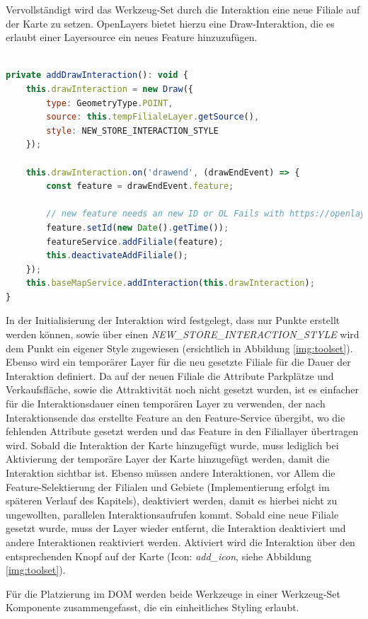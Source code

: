 Vervollständigt wird das Werkzeug-Set durch die Interaktion eine neue Filiale auf der Karte zu setzen.
OpenLayers bietet hierzu eine Draw-Interaktion, die es erlaubt einer Layersource ein neues Feature hinzuzufügen.

\begin{lstlisting}[language=JavaScript]

private addDrawInteraction(): void {
	this.drawInteraction = new Draw({
		type: GeometryType.POINT,
		source: this.tempFilialeLayer.getSource(),
		style: NEW_STORE_INTERACTION_STYLE
	});
	
	this.drawInteraction.on('drawend', (drawEndEvent) => {
		const feature = drawEndEvent.feature;
		
		// new feature needs an new ID or OL Fails with https://openlayers.org/en/v6.3.1/doc/errors/#30
		feature.setId(new Date().getTime());
		featureService.addFiliale(feature);
		this.deactivateAddFiliale();
	});
	this.baseMapService.addInteraction(this.drawInteraction);
}
\end{lstlisting}

In der Initialisierung der Interaktion wird festgelegt, dass nur Punkte erstellt werden können, sowie über einen \emph{NEW\_STORE\_INTERACTION\_STYLE} wird dem Punkt ein eigener Style zugewiesen (ersichtlich in Abbildung \ref{img:toolset}).
Ebenso wird ein temporärer Layer für die neu gesetzte Filiale für die Dauer der Interaktion definiert.
Da auf der neuen Filiale die Attribute Parkplätze und Verkaufsfläche, sowie die Attraktivität noch nicht gesetzt wurden, ist es einfacher für die Interaktionsdauer einen temporären Layer zu verwenden, der nach Interaktionsende das erstellte Feature an den Feature-Service übergibt, wo die fehlenden Attribute gesetzt werden und das Feature in den Filiallayer übertragen wird. 
Sobald die Interaktion der Karte hinzugefügt wurde, muss lediglich bei Aktivierung der temporäre Layer der Karte hinzugefügt werden, damit die Interaktion sichtbar ist.
Ebenso müssen andere Interaktionen, vor Allem die Feature-Selektierung der Filialen und Gebiete (Implementierung erfolgt im späteren Verlauf des Kapitels), deaktiviert werden, damit es hierbei nicht zu ungewollten, parallelen Interaktionsaufrufen kommt.
Sobald eine neue Filiale gesetzt wurde, muss der Layer wieder entfernt, die Interaktion deaktiviert und andere Interaktionen reaktiviert werden.
Aktiviert wird die Interaktion über den entsprechenden Knopf auf der Karte (Icon: \emph{add\_icon}, siehe Abbildung \ref{img:toolset}).

Für die Platzierung im DOM werden beide Werkzeuge in einer Werkzeug-Set Komponente zusammengefasst, die ein einheitliches Styling erlaubt.

